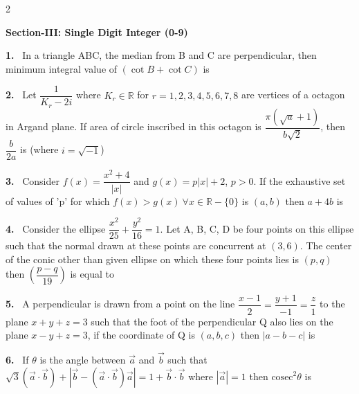 \documentclass[10pt]{extarticle}
\newcommand{\sect}[1]{\par\smallskip\noindent\textbf{#1}\par}
\newcommand{\qn}[1]{\par\smallskip\noindent\textbf{#1.}~}
\begin{document}
\begin{multicols}{2}
\sect{Section-III: Single Digit Integer (0-9)}

\qn{1} In a triangle ABC, the median from B and C are perpendicular, then minimum integral value of $(\cot B + \cot C)$ is

\qn{2} Let $\dfrac{1}{K_r - 2i}$ where $K_r\in\mathbb{R}$ for $r = 1,2,3,4,5,6,7,8$ are vertices of a octagon in Argand plane. If area of circle inscribed in this octagon is $\dfrac{\pi(\sqrt a+1)}{b\sqrt2}$, then $\dfrac{b}{2a}$ is (where $i=\sqrt{-1}$)

\qn{3} Consider $f(x) = \dfrac{x^2+4}{|x|}$ and $g(x) = p|x|+2$, $p>0$. If the exhaustive set of values of 'p' for which $f(x) > g(x)\ \forall x\in\mathbb{R}-\{0\}$ is $(a,b)$ then $a+4b$ is

\qn{4} Consider the ellipse $\dfrac{x^2}{25} + \dfrac{y^2}{16} = 1$. Let A, B, C, D be four points on this ellipse such that the normal drawn at these points are concurrent at $(3,6)$. The center of the conic other than given ellipse on which these four points lies is $(p,q)$ then $\left(\dfrac{p-q}{19}\right)$ is equal to

\qn{5} A perpendicular is drawn from a point on the line $\dfrac{x-1}{2} = \dfrac{y+1}{-1} = \dfrac{z}{1}$ to the plane $x+y+z=3$ such that the foot of the perpendicular Q also lies on the plane $x-y+z=3$, if the coordinate of Q is $(a,b,c)$ then $|a-b-c|$ is

\qn{6} If $\theta$ is the angle between $\vec a$ and $\vec b$ such that $\sqrt3(\vec a\cdot\vec b) + \left|\vec b - (\vec a\cdot\vec b)\vec a\right| = 1 + \vec b\cdot\vec b$ where $|\vec a| = 1$ then $\mathrm{cosec}^2\theta$ is

\end{multicols}
\end{document}
